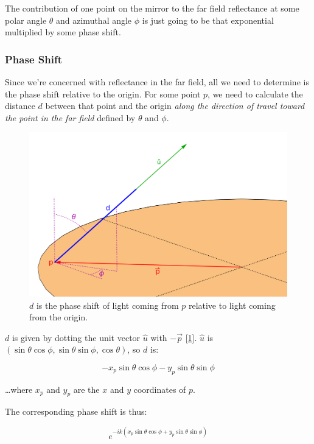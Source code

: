 \documentclass[etd,oneside,senior]{BYUPhys}
\begin{document}
The contribution of one point on the mirror to the far field reflectance at some polar angle $\theta$ and azimuthal angle $\phi$ is just going to be that exponential multiplied by some phase shift.

\subsubsection{Phase Shift}
Since we're concerned with reflectance in the far field, all we need to determine is the phase shift relative to the origin. For some point $p$, we need to calculate the distance $d$ between that point and the origin \textit{along the direction of travel toward the point in the far field} defined by $\theta$ and $\phi$.

\begin{figure}
  \centerline{\includegraphics[width=\textwidth]{phase-length}}
  \caption[Phase length of a beam of light]{\label{fig:phase_length}
    $d$ is the phase shift of light coming from $p$ relative to light coming from the origin.}
\end{figure}

$d$ is given by dotting the unit vector $\hat{u}$ with $-\vec{p}$ [\ref{fig:phase_length}]. $\hat{u}$ is $\left(\sin{\theta}\cos{\phi},\sin{\theta}\sin{\phi},\cos{\theta}\right)$, so $d$ is:

\begin{equation}
  -x_p\sin{\theta}\cos{\phi}-y_p\sin{\theta}\sin{\phi}
\end{equation}

\ldots where $x_p$ and $y_p$ are the $x$ and $y$ coordinates of $p$.

The corresponding phase shift is thus:

\begin{equation}
  e^{-ik(x_p\sin{\theta}\cos{\phi}+y_p\sin{\theta}\sin{\phi})}
\end{equation}
\end{document}
